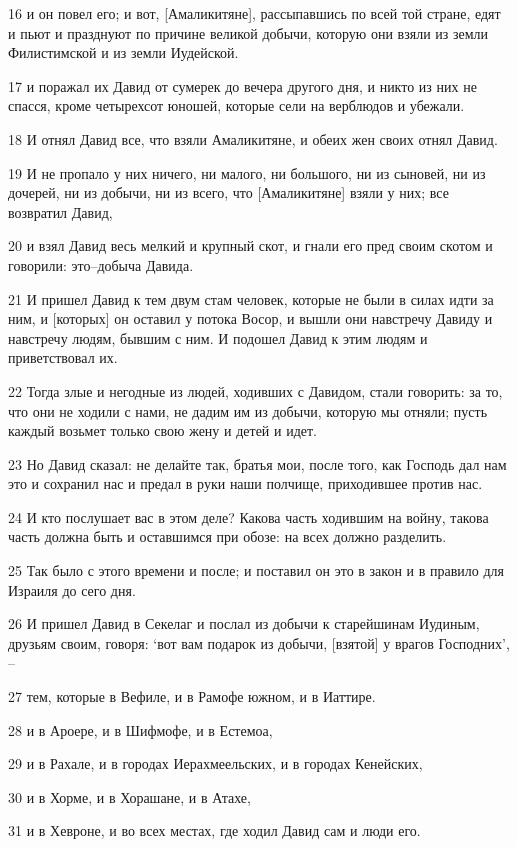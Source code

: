 \par 16 и он повел его; и вот, [Амаликитяне], рассыпавшись по всей той стране, едят и пьют и празднуют по причине великой добычи, которую они взяли из земли Филистимской и из земли Иудейской.
\par 17 и поражал их Давид от сумерек до вечера другого дня, и никто из них не спасся, кроме четырехсот юношей, которые сели на верблюдов и убежали.
\par 18 И отнял Давид все, что взяли Амаликитяне, и обеих жен своих отнял Давид.
\par 19 И не пропало у них ничего, ни малого, ни большого, ни из сыновей, ни из дочерей, ни из добычи, ни из всего, что [Амаликитяне] взяли у них; все возвратил Давид,
\par 20 и взял Давид весь мелкий и крупный скот, и гнали его пред своим скотом и говорили: это--добыча Давида.
\par 21 И пришел Давид к тем двум стам человек, которые не были в силах идти за ним, и [которых] он оставил у потока Восор, и вышли они навстречу Давиду и навстречу людям, бывшим с ним. И подошел Давид к этим людям и приветствовал их.
\par 22 Тогда злые и негодные из людей, ходивших с Давидом, стали говорить: за то, что они не ходили с нами, не дадим им из добычи, которую мы отняли; пусть каждый возьмет только свою жену и детей и идет.
\par 23 Но Давид сказал: не делайте так, братья мои, после того, как Господь дал нам это и сохранил нас и предал в руки наши полчище, приходившее против нас.
\par 24 И кто послушает вас в этом деле? Какова часть ходившим на войну, такова часть должна быть и оставшимся при обозе: на всех должно разделить.
\par 25 Так было с этого времени и после; и поставил он это в закон и в правило для Израиля до сего дня.
\par 26 И пришел Давид в Секелаг и послал из добычи к старейшинам Иудиным, друзьям своим, говоря: `вот вам подарок из добычи, [взятой] у врагов Господних', --
\par 27 тем, которые в Вефиле, и в Рамофе южном, и в Иаттире.
\par 28 и в Ароере, и в Шифмофе, и в Естемоа,
\par 29 и в Рахале, и в городах Иерахмеельских, и в городах Кенейских,
\par 30 и в Хорме, и в Хорашане, и в Атахе,
\par 31 и в Хевроне, и во всех местах, где ходил Давид сам и люди его.

